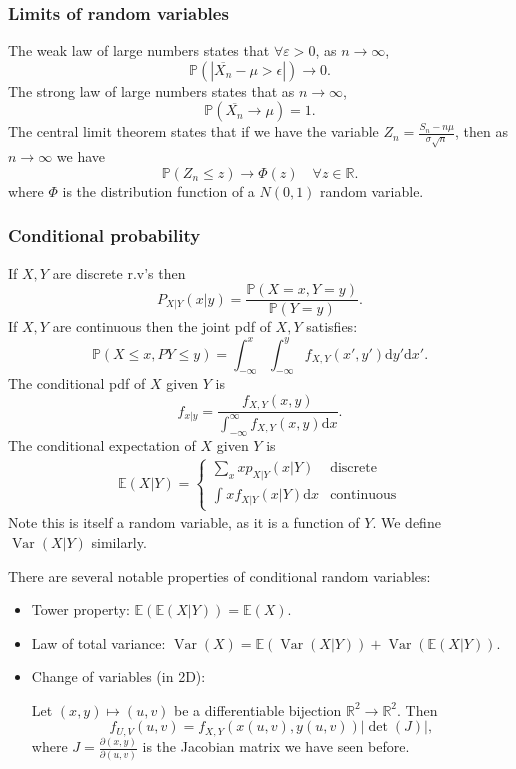\documentclass[egregdoesnotlikesansseriftitles,a4paper]{scrartcl}
\begin{document}
\subsubsection*{Limits of random variables}
The weak law of large numbers states that $\forall \varepsilon >0$, as $n \rightarrow \infty$, \[
\mathbb{P} \left(|\overline{X_n} -\mu > \epsilon|\right) \rightarrow 0
.\] 
The strong law of large numbers states that as $n \rightarrow \infty$, \[
\mathbb{P}(\overline{X_{n}} \rightarrow \mu)=1
.\] The central limit theorem states that if we have the variable $Z_{n}= \frac{S_{n}-n \mu}{\sigma \sqrt{n}}$, then as $n \rightarrow \infty$ we have \[
\mathbb{P}(Z_{n} \leq z) \rightarrow \Phi (z) \quad \forall z \in \mathbb{R}
.\] where $\Phi$ is the distribution function of a $N (0,1)$ random variable.  
\subsubsection*{Conditional probability}
\begin{definition*}
     If $X,Y$ are discrete r.v's then \[
     P_{X|Y}(x|y)= \frac{\mathbb{P}(X=x, Y=y)}{\mathbb{P}(Y=y)}
     .\]   
     If $X,Y$ are continuous then the joint pdf of $X,Y$ satisfies: \[
     \mathbb{P}(X \leq x, P Y \leq y)=\int_{- \infty}^{x}\int_{- \infty}^{y}f_{X,Y} (x',y')\mathrm{d}y'  \mathrm{d}x' 
     .\] 
     The conditional pdf of $X$ given $Y$ is \[
     f_{x|y}= \frac{f_{X,Y}(x,y)}{\int_{- \infty}^{ \infty}f_{X,Y}(x,y) \mathrm{d}x }
     .\] 
     The conditional expectation of $X$ given $Y$ is 
     \begin{align*}
          \mathbb{E}(X|Y)=
          \begin{cases}
               \sum_{x}^{}xp_{X|Y}(x|Y) & \text{discrete}\\
               \int_{}^{}x f_{X|Y}(x|Y) \mathrm{d}x & \text{continuous}
          \end{cases}
     \end{align*}
     Note this is itself a random variable, as it is a function of $Y$. We define $\operatorname{Var}(X|Y)$ similarly. 
\end{definition*}
There are several notable properties of conditional random variables:
\begin{itemize}
     \item Tower property: $\mathbb{E}(\mathbb{E}(X|Y))=\mathbb{E}(X)$.
     \item Law of total variance: $\operatorname{Var}(X)=\mathbb{E}(\operatorname{Var}(X|Y))+\operatorname{Var}(\mathbb{E}(X|Y))$. 
     \item Change of variables (in 2D):

     Let $(x,y) \mapsto (u,v)$ be a differentiable bijection $\mathbb{R}^{2} \rightarrow \mathbb{R}^{2} $. Then \[
     f_{U,V}(u,v)=f_{X,Y}(x (u,v),y (u,v))|\det (J)|
     ,\] where $J=\frac{\partial (x,y)}{\partial (u,v)}$ is the Jacobian matrix we have seen before. 
\end{itemize}
\newpage
\end{document}
